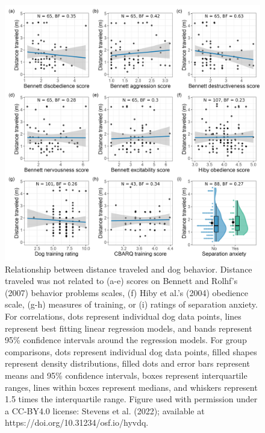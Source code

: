 \documentclass[
  doc]{apa6}
\begin{document}
\begin{figure}

{\centering \includegraphics[width=0.95\linewidth]{figures/dog_behavior} 

}

\caption{Relationship between distance traveled and dog behavior. Distance traveled was not related to (a-e) scores on Bennett and Rolhf's (2007) behavior problems scales, (f) Hiby et al.'s (2004) obedience scale, (g-h) measures of training, or (i) ratings of separation anxiety. For correlations, dots represent individual dog data points, lines represent best fitting linear regression models, and bands represent 95\% confidence intervals around the regression models. For group comparisons, dots represent individual dog data points, filled shapes represent density distributions, filled dots and error bars represent means and 95\% confidence intervals, boxes represent interquartile ranges, lines within boxes represent medians, and whiskers represent 1.5 times the interquartile range.  Figure used with permission under a CC-BY4.0 license: Stevens et al. (2022); available at https://doi.org/10.31234/osf.io/hyvdq.}\label{fig:dog-behavior}
\end{figure}
\end{document}
